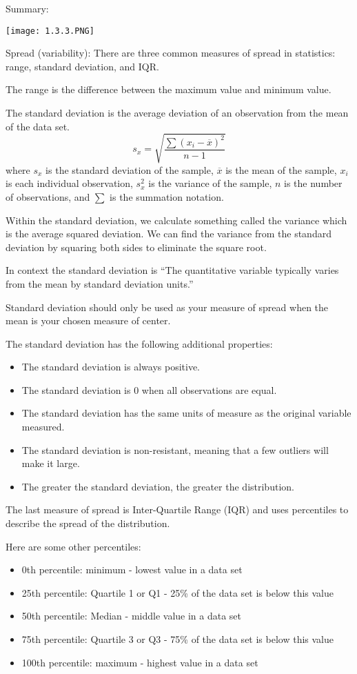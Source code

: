 \documentclass[../stats.tex]{subfiles}
\begin{document}
Summary:
\begin{center}
    \texttt{[image: 1.3.3.PNG]}
\end{center}

Spread (variability): There are three common measures of spread in statistics: range, standard deviation, and IQR.

The range is the difference between the maximum value and minimum value.

The standard deviation is the average deviation of an observation from the mean of the data set.
\[ s_x = \sqrt{\frac{\sum (x_i-\overline{x})^2}{n-1}} \]
where $s_x$ is the standard deviation of the sample, $\overline{x}$ is the mean of the sample, $x_i$ is each individual observation, $s_x^2$ is the variance of the sample, $n$ is the number of observations, and $\sum$ is the summation notation.

Within the standard deviation, we calculate something called the variance which is the average squared deviation. We can find the variance from the standard deviation by squaring both sides to eliminate the square root.

In context the standard deviation is ``The {quantitative variable} typically varies from the mean by {standard deviation} {units}.''

Standard deviation should only be used as your measure of spread when the mean is your chosen measure of center.

The standard deviation has the following additional properties:
\begin{itemize}
    \item The standard deviation is always positive.
    \item The standard deviation is 0 when all observations are equal.
    \item The standard deviation has the same units of measure as the original variable measured.
    \item The standard deviation is non-resistant, meaning that a few outliers will make it large.
    \item The greater the standard deviation, the greater the distribution.
\end{itemize}

The last measure of spread is Inter-Quartile Range (IQR) and uses percentiles to describe the spread of the distribution.

Here are some other percentiles:
\begin{itemize}
    \item 0th percentile: minimum - lowest value in a data set 
    \item 25th percentile: Quartile 1 or Q1 - 25\% of the data set is below this value 
    \item 50th percentile: Median - middle value in a data set 
    \item 75th percentile: Quartile 3 or Q3 - 75\% of the data set is below this value 
    \item 100th percentile: maximum - highest value in a data set 
\end{itemize}
\end{document}
